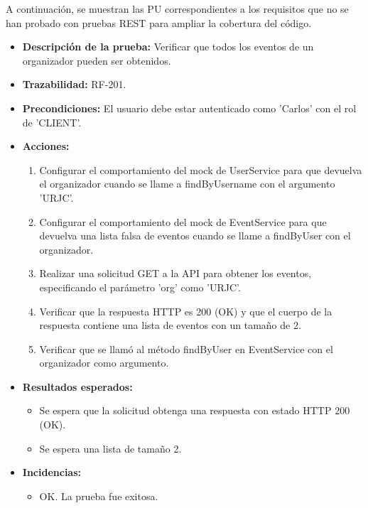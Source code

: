 A continuación, se muestran las PU correspondientes a los requisitos que no se han probado con pruebas REST para ampliar la cobertura del código.

\begin{itemize}
    \item \textbf{Descripción de la prueba:} Verificar que todos los eventos de un organizador pueden ser obtenidos.
    \item \textbf{Trazabilidad:} RF-201.
    \item \textbf{Precondiciones:} El usuario debe estar autenticado como 'Carlos' con el rol de 'CLIENT'.
    \item \textbf{Acciones:}
    \begin{enumerate}
        \item Configurar el comportamiento del mock de UserService para que devuelva el organizador cuando se llame a findByUsername con el argumento 'URJC'.
        \item Configurar el comportamiento del mock de EventService para que devuelva una lista falsa de eventos cuando se llame a findByUser con el organizador.
        \item Realizar una solicitud GET a la API para obtener los eventos, especificando el parámetro 'org' como 'URJC'.
        \item Verificar que la respuesta HTTP es 200 (OK) y que el cuerpo de la respuesta contiene una lista de eventos con un tamaño de 2.
        \item Verificar que se llamó al método findByUser en EventService con el organizador como argumento.
    \end{enumerate}
    \item \textbf{Resultados esperados:}
    \begin{itemize}
        \item Se espera que la solicitud obtenga una respuesta con estado HTTP 200 (OK).
        \item Se espera una lista de tamaño 2.
    \end{itemize}
    \item \textbf{Incidencias:}
    \begin{itemize}
        \item OK. La prueba fue exitosa.
    \end{itemize}
\end{itemize}

